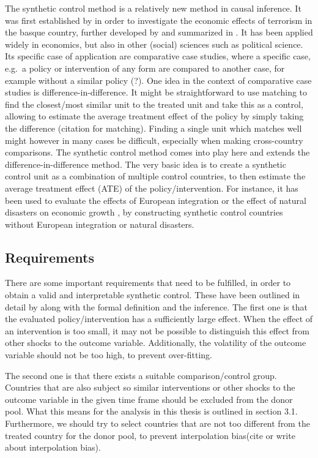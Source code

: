 \documentclass{scrbook}
\begin{document}
The synthetic control method is a relatively new method in causal
inference. It was first established by \textcite{abadie_economic_2003}
in order to investigate the economic effects of terrorism in the basque
country, further developed by \textcite{abadie_synthetic_2010} and
summarized in \textcite{abadie_using_2021}. It has been applied widely
in economics, but also in other (social) sciences such as political
science. Its specific case of application are comparative case studies,
where a specific case, e.g.~a policy or intervention of any form are
compared to another case, for example without a similar policy (?). One
idea in the context of comparative case studies is
difference-in-difference. It might be straightforward to use matching to
find the closest/most similar unit to the treated unit and take this as
a control, allowing to estimate the average treatment effect of the
policy by simply taking the difference (citation for matching). Finding
a single unit which matches well might however in many cases be
difficult, especially when making cross-country comparisons. The
synthetic control method comes into play here and extends the
difference-in-difference method. The very basic idea is to create a
synthetic control unit as a combination of multiple control countries,
to then estimate the average treatment effect (ATE) of the
policy/intervention. For instance, it has been used to evaluate the
effects of European integration \parencite{campos_institutional_2019} or
the effect of natural disasters on economic growth
\parencite{cavallo_catastrophic_2013}, by constructing synthetic control
countries without European integration or natural disasters.

\subsection*{Requirements}

There are some important requirements that need to be fulfilled, in
order to obtain a valid and interpretable synthetic control. These have
been outlined in detail by \textcite{abadie_using_2021} along with the
formal definition and the inference. The first one is that the evaluated
policy/intervention has a sufficiently large effect. When the effect of
an intervention is too small, it may not be possible to distinguish this
effect from other shocks to the outcome variable. Additionally, the
volatility of the outcome variable should not be too high, to prevent
over-fitting.

The second one is that there exists a suitable comparison/control group.
Countries that are also subject so similar interventions or other shocks
to the outcome variable in the given time frame should be excluded from
the donor pool. What this means for the analysis in this thesis is
outlined in section 3.1. Furthermore, we should try to select countries
that are not too different from the treated country for the donor pool,
to prevent interpolation bias(cite or write about interpolation bias).
\end{document}
